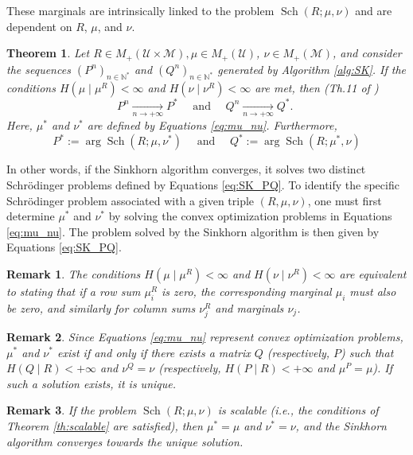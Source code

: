 \documentclass{article}
\newtheorem{theorem}{Theorem}[section] %
\newtheorem{remark}{Remark}[section] %
\begin{document}
These marginals are intrinsically linked to the problem $\operatorname{Sch}(R ; \mu, \nu)$ and are dependent on $R$, $\mu$, and $\nu$.

\begin{theorem} \label{th:convergence}
Let $R \in M_{+}(\mathcal{U} \times \mathcal{M}), \mu \in M_{+}(\mathcal{U})$, $\nu \in M_{+}(\mathcal{M})$, and consider the sequences $\left(P^n\right)_{n \in \mathbb{N}^*}$ and $\left(Q^n\right)_{n \in \mathbb{N}^*}$ generated by Algorithm \ref{alg:SK}. If the conditions $H(\mu \mid \mu^R)<\infty $ and $H(\nu \mid \nu^R) < \infty$ are met, then (Th.11 of \cite{baradat2023convergencesinkhornalgorithmschrodinger})
$$
P^n \underset{n \rightarrow+\infty}{\longrightarrow} P^* \quad \text { and } \quad Q^n \underset{n \rightarrow+\infty}{\longrightarrow} Q^* \text {. }
$$
Here, $\mu^*$ and $\nu^*$ are defined by Equations \ref{eq:mu_nu}. Furthermore,
\begin{equation}\label{eq:SK_PQ}
P^*:=\arg \operatorname{Sch}(R ; \mu, \nu^*) \quad \text { and } \quad Q^*:=\arg \operatorname{Sch}(R ; \mu^*, \nu)
\end{equation}
\end{theorem}

In other words, if the Sinkhorn algorithm converges, it solves two distinct Schrödinger problems defined by Equations \ref{eq:SK_PQ}. To identify the specific Schrödinger problem associated with a given triple $(R,\mu,\nu)$, one must first determine $\mu^*$ and $\nu^*$ by solving the convex optimization problems in Equations \ref{eq:mu_nu}. The problem solved by the Sinkhorn algorithm is then given by Equations \ref{eq:SK_PQ}.
\begin{remark}
    The conditions $H(\mu \mid \mu^R)<\infty $ and $H(\nu \mid \nu^R) < \infty$ are equivalent to stating that if a row sum $\mu_i^R$ is zero, the corresponding marginal $\mu_i$ must also be zero, and similarly for column sums $\nu_j^R$ and marginals $\nu_j$.
\end{remark}
\begin{remark}
    Since Equations \ref{eq:mu_nu} represent convex optimization problems, $\mu^*$ and $\nu^*$ exist if and only if there exists a matrix $Q$ (respectively, $P$) such that $H(Q \mid R)<+\infty$ and $\nu^Q=\nu$ (respectively, $H(P \mid R)<+\infty$ and $\mu^P=\mu$). If such a solution exists, it is unique.
\end{remark}
\begin{remark}
If the problem $\operatorname{Sch}(R ; \mu, \nu)$ is \textit{scalable} (i.e., the conditions of Theorem \ref{th:scalable} are satisfied), then $\mu^*=\mu$ and $\nu^*=\nu$, and the Sinkhorn algorithm converges towards the unique solution.
\end{remark}
\end{document}
